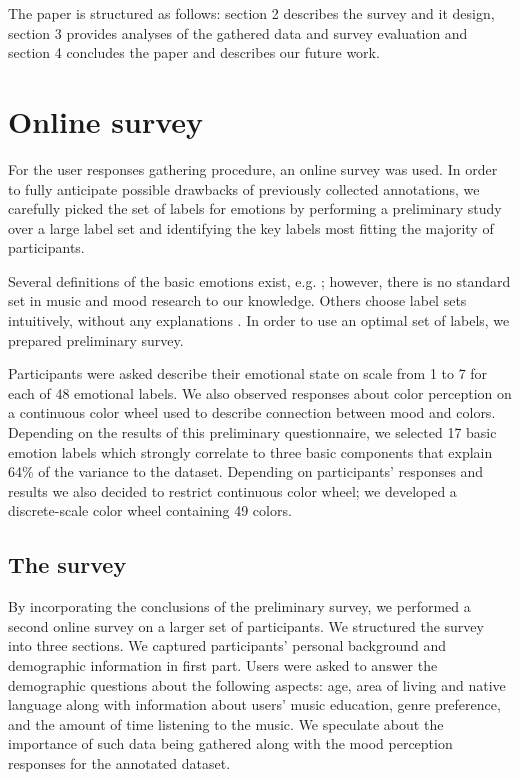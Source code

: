 \documentclass[a4paper]{article}
\begin{document}
The paper is structured as follows: section 2 describes the survey and it design, section 3 provides analyses of the gathered data and survey evaluation and section 4 concludes the paper and describes our future work.


\section{Online survey}

For the user responses gathering procedure, an online survey was used. In order to fully anticipate possible drawbacks of previously collected annotations, we carefully picked the set of labels for emotions by performing a preliminary study over a large label set and identifying the key labels most fitting the majority of participants.

Several definitions of the basic emotions exist, e.g. \cite{dalgleish1999handbook}; however, there is no standard set in music and mood research to our knowledge. Others choose label sets intuitively, without any explanations \cite{wu2013spectral}. In order to use an optimal set of labels, we prepared preliminary survey.

Participants were asked describe their emotional state on scale from 1 to 7 for each of 48 emotional labels. We also observed responses about color perception on a continuous color wheel used to describe connection between mood and colors. Depending on the results of this preliminary questionnaire, we selected 17 basic emotion labels which strongly correlate to three basic components that explain 64\% of the variance to the dataset. Depending on participants' responses and results we also decided to restrict continuous color wheel; we developed a discrete-scale color wheel containing 49 colors. 

\subsection{The survey}

By incorporating the conclusions of the preliminary survey, we performed a second  online survey on a larger set of participants. We structured the survey into three sections. We captured participants' personal background and demographic information in first part. Users were asked to answer the demographic questions about the following aspects: age, area of living and native language along with information about users' music education, genre preference, and the amount of time listening to the music. We speculate about the importance of such data being gathered along with the mood perception responses for the annotated dataset. 
\end{document}
